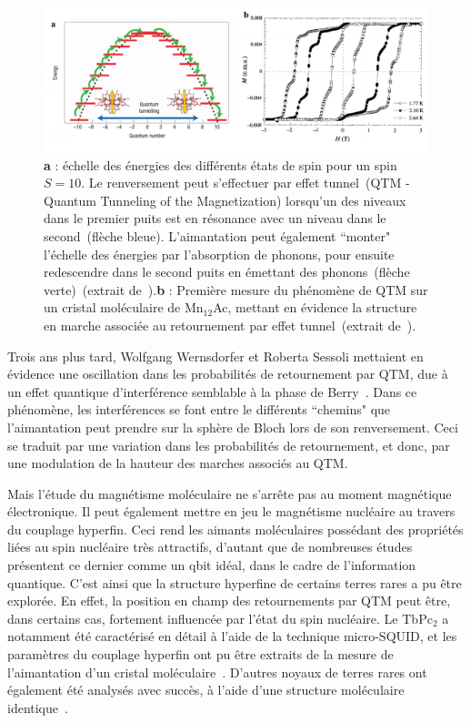 \begin{figure}
\centering \includegraphics[scale=0.45]{Spintronique/MolecularMag/MolecularMag.pdf}
\caption{ \textbf{a} : échelle des énergies des différents états de spin pour un spin $S=10$. Le renversement peut s'effectuer par effet tunnel~(QTM - Quantum Tunneling of the Magnetization) lorsqu'un des niveaux dans le premier puits est en résonance avec un niveau dans le second~(flèche bleue). L'aimantation peut également ``monter" l'échelle des énergies par l’absorption de phonons, pour ensuite redescendre dans le second puits en émettant des phonons~(flèche verte)~(extrait de~\cite{Bogani2008}).\textbf{b} : Première mesure du phénomène de QTM sur un cristal moléculaire de Mn$_{12}$Ac, mettant en évidence la structure en marche associée au retournement par effet tunnel~(extrait de~\cite{Thomas1996}).}
\label{MolecularMag}
\end{figure}

Trois ans plus tard, Wolfgang Wernsdorfer et Roberta Sessoli mettaient en évidence une oscillation dans les probabilités de retournement par QTM, due à un effet quantique d'interférence semblable à la phase de Berry~\cite{Wernsdorfer1999}. Dans ce phénomène, les interférences se font entre le différents ``chemins" que l’aimantation peut prendre sur la sphère de Bloch lors de son renversement. Ceci se traduit par une variation dans les probabilités de retournement, et donc, par une modulation de la hauteur des marches associés au QTM.

Mais l'étude du magnétisme moléculaire ne s'arr\^ete pas au moment magnétique électronique. Il peut également mettre en jeu le magnétisme nucléaire au travers du couplage hyperfin. Ceci rend les aimants moléculaires possédant des propriétés liées au spin nucléaire très attractifs, d'autant que de nombreuses études présentent ce dernier comme un qbit idéal, dans le cadre de l'information quantique. C'est ainsi que la structure hyperfine de certains terres rares a pu être explorée. En effet, la position en champ des retournements par QTM peut être, dans certains cas, fortement influencée par l'état du spin nucléaire. Le TbPc$_{2}$ a notamment été caractérisé en détail à l'aide de la technique micro-SQUID, et les paramètres du couplage hyperfin ont pu être extraits de la mesure de l'aimantation d'un cristal moléculaire~\cite{Ishikawa2005}. D'autres noyaux de terres rares ont également été analysés avec succès, à l'aide d'une structure moléculaire identique~\cite{Ishikawa2005a}.

